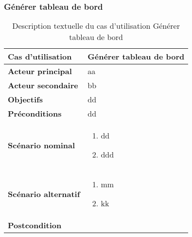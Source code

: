         \subsubsection[Générer tableau de bord]{Générer tableau de bord}
        \begin{longtable}{p{4cm} p{9cm}}
            \caption{Description textuelle du cas d’utilisation Générer tableau de bord}
            \label{table:usecaseDashboard}
            \\\hline\hline
                \textbf{Cas d’utilisation} & \textbf{Générer tableau de bord}
            \\\hline\hline
                    \textbf{Acteur principal} & aa
                \\
                    \textbf{Acteur secondaire} & bb
                \\
                    \textbf{Objectifs} & dd
                \\
                    \textbf{Préconditions} & dd
                \\
                \textbf{Scénario nominal} &
                    \begin{enumerate}[leftmargin=*]
                        \item dd
                        \item ddd
                    \end{enumerate}
                \\
                \textbf{Scénario alternatif} &
                    \begin{enumerate}[leftmargin=*]
                        \item mm
                        \item kk
                    \end{enumerate}
                \\
                \textbf{Postcondition}
            \\\bottomrule
        \end{longtable}

